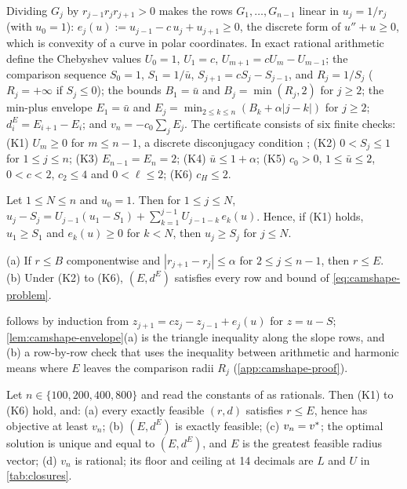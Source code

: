 Dividing $G_j$ by $r_{j-1}r_jr_{j+1}>0$ makes the rows $G_1,\dots,G_{n-1}$ linear in $u_j=1/r_j$ (with $u_0=1$):
$e_j(u):=u_{j-1}-c\,u_j+u_{j+1}\ge0$, the discrete form of $u''+u\ge0$, which is convexity of a curve in polar coordinates.
In exact rational arithmetic define the Chebyshev values $U_0=1$, $U_1=c$, $U_{m+1}=cU_m-U_{m-1}$; the comparison sequence $S_0=1$, $S_1=1/\bar u$, $S_{j+1}=cS_j-S_{j-1}$, and $R_j=1/S_j$ ($R_j=+\infty$ if $S_j\le0$); the bounds $B_1=\bar u$ and $B_j=\min(R_j,2)$ for $j\ge2$; the min-plus envelope $E_1=\bar u$ and $E_j=\min_{2\le k\le n}(B_k+\alpha|j-k|)$ for $j\ge2$; $d^E_i=E_{i+1}-E_i$; and $v_n=-c_0\sum_jE_j$.
The certificate consists of six finite checks:
(K1) $U_m\ge0$ for $m\le n-1$, a discrete disconjugacy condition \citep{bohner1996-linear-hamiltonian-difference-systems-disconjugacy};
(K2) $0<S_j\le1$ for $1\le j\le n$;
(K3) $E_{n-1}=E_n=2$;
(K4) $\bar u\le1+\alpha$;
(K5) $c_0>0$, $1\le\bar u\le2$, $0<c<2$, $c_2\le4$ and $0<\ell\le2$;
(K6) $c_H\le2$.

\begin{lemma}\label{lem:camshape-sturm}
Let $1\le N\le n$ and $u_0=1$. Then for $1\le j\le N$,
$u_j-S_j=U_{j-1}(u_1-S_1)+\sum_{k=1}^{j-1}U_{j-1-k}\,e_k(u)$.
Hence, if (K1) holds, $u_1\ge S_1$ and $e_k(u)\ge0$ for $k<N$, then $u_j\ge S_j$ for $j\le N$.
\end{lemma}

\begin{lemma}\label{lem:camshape-envelope}
(a) If $r\le B$ componentwise and $|r_{j+1}-r_j|\le\alpha$ for $2\le j\le n-1$, then $r\le E$.
(b) Under (K2) to (K6), $(E,d^E)$ satisfies every row and bound of \eqref{eq:camshape-problem}.
\end{lemma}

 follows by induction from $z_{j+1}=cz_j-z_{j-1}+e_j(u)$ for $z=u-S$; \cref{lem:camshape-envelope}(a) is the triangle inequality along the slope rows, and (b) a row-by-row check that uses the inequality between arithmetic and harmonic means where $E$ leaves the comparison radii $R_j$ (\cref{app:camshape-proof}).

\begin{theorem}\label{thm:camshape-opt}
Let $n\in\{100,200,400,800\}$ and read the constants of  as rationals. Then (K1) to (K6) hold, and:
(a) every exactly feasible $(r,d)$ satisfies $r\le E$, hence has objective at least $v_n$;
(b) $(E,d^E)$ is exactly feasible;
(c) $v_n=v^{*}$; the optimal solution is unique and equal to $(E,d^E)$, and $E$ is the greatest feasible radius vector;
(d) $v_n$ is rational; its floor and ceiling at 14 decimals are $L$ and $U$ in \cref{tab:closures}.
\end{theorem}

